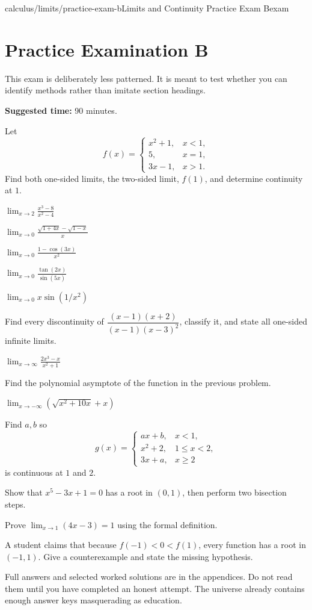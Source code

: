 \begin{webpage}{calculus/limits/practice-exam-b}{Limits and Continuity Practice Exam B}{exam}
\section{Practice Examination B}

This exam is deliberately less patterned. It is meant to test whether you can identify methods rather than imitate section headings.

\textbf{Suggested time:} 90 minutes.

\begin{bgexercises}[label=\textbf{B\arabic*.}]
  \item Let
  \[
    f(x)=\begin{cases}
      x^2+1,&x<1,\\
      5,&x=1,\\
      3x-1,&x>1.
    \end{cases}
  \]
  Find both one-sided limits, the two-sided limit, \(f(1)\), and determine continuity at \(1\).
  \item \(\displaystyle\lim_{x\to2}\frac{x^3-8}{x^2-4}\)
  \item \(\displaystyle\lim_{x\to0}\frac{\sqrt{1+4x}-\sqrt{1-x}}x\)
  \item \(\displaystyle\lim_{x\to0}\frac{1-\cos(3x)}{x^2}\)
  \item \(\displaystyle\lim_{x\to0}\frac{\tan(2x)}{\sin(5x)}\)
  \item \(\displaystyle\lim_{x\to0}x\sin(1/x^2)\)
  \item Find every discontinuity of \(\dfrac{(x-1)(x+2)}{(x-1)(x-3)^2}\), classify it, and state all one-sided infinite limits.
  \item \(\displaystyle\lim_{x\to\infty}\frac{2x^3-x}{x^2+1}\)
  \item Find the polynomial asymptote of the function in the previous problem.
  \item \(\displaystyle\lim_{x\to-\infty}(\sqrt{x^2+10x}+x)\)
  \item Find \(a,b\) so
  \[
    g(x)=\begin{cases}
      ax+b,&x<1,\\
      x^2+2,&1\le x<2,\\
      3x+a,&x\ge2
    \end{cases}
  \]
  is continuous at \(1\) and \(2\).
  \item Show that \(x^5-3x+1=0\) has a root in \((0,1)\), then perform two bisection steps.
  \item Prove \(\lim_{x\to1}(4x-3)=1\) using the formal definition.
  \item A student claims that because \(f(-1)<0<f(1)\), every function has a root in \((-1,1)\). Give a counterexample and state the missing hypothesis.
\end{bgexercises}

Full answers and selected worked solutions are in the appendices. Do not read them until you have completed an honest attempt. The universe already contains enough answer keys masquerading as education.
\end{webpage}
